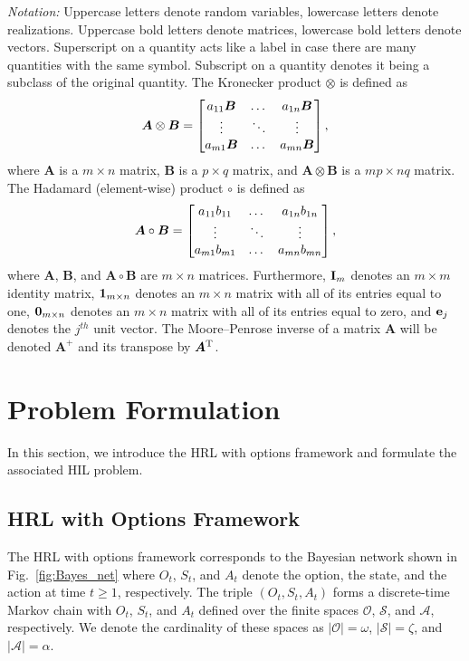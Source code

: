 \emph{Notation:}
Uppercase letters denote random variables, lowercase letters denote realizations. Uppercase bold letters denote matrices, lowercase bold letters denote vectors. Superscript on a quantity acts like a label in case there are many quantities with the same symbol. Subscript on a quantity denotes it being a subclass of the original quantity.
The Kronecker product $\otimes$ is defined as
\[
    \bm{A}\otimes \bm{B}=\bmat{a_{11}\bm{B}&\dots&a_{1n}\bm{B}\\ \vdots&\ddots&\vdots\\ a_{m1}\bm{B}&\dots&a_{mn}\bm{B}},
\]
where $\bm A$ is a $m\times n$ matrix, $\bm B$ is a $p\times q$ matrix, 
and $\bm{A}\otimes \bm{B}$ is a $mp\times nq$ matrix.
The Hadamard (element-wise) product $\circ$ is defined as
\[
    \bm{A}\circ \bm{B}=\bmat{a_{11}b_{11}&\dots&a_{1n}b_{1n}\\ \vdots&\ddots&\vdots\\
    a_{m1}b_{m1}&\dots&a_{mn}b_{mn}},
\]
where $\bm A$, $\bm B$, and $\bm{A}\circ \bm{B}$ are $m\times n$ matrices.
Furthermore, $\mathbf{I}_m$ denotes an $m\times m$ identity matrix, 
$\bm{\mathrm{1}}_{m\times n}$ denotes an $m\times n$ matrix with all of its entries equal to one, $\bm{\mathrm{0}}_{m\times n}$ denotes an $m\times n$ matrix with all of its entries equal to zero, and $\bm{\mathrm{e}}_j$ denotes the $j^{th}$ unit vector.
The Moore–Penrose inverse of a matrix $\bm A$ will be denoted $\bm A^+$ and its transpose by ${\bm A}^{\mathrm{T}}$.

\section{Problem Formulation}
\label{sec:problem}

In this section, we introduce the HRL with \citep{Bauer:2007}options framework \citep{SUTTON1999181,Barto2003} and formulate the associated HIL problem.

\subsection{HRL with Options Framework}
The HRL with options framework corresponds to the Bayesian network shown in Fig.~\ref{fig:Bayes_net} where $O_t$, $S_t$, and $A_t$ denote the option, the state, and the action at time $t \geq 1$, respectively.
The triple $(O_t,S_t,A_t)$ forms a discrete-time Markov chain with $O_t$, $S_t$, and $A_t$ defined over the finite spaces $\mathcal{O}$, $\mathcal{S}$, and $\mathcal{A}$, respectively.
We denote the cardinality of these spaces as 
$\vert\mathcal{O}\vert=\omega$, $\vert\mathcal{S}\vert=\zeta$, and $\vert\mathcal{A}\vert=\alpha$.

